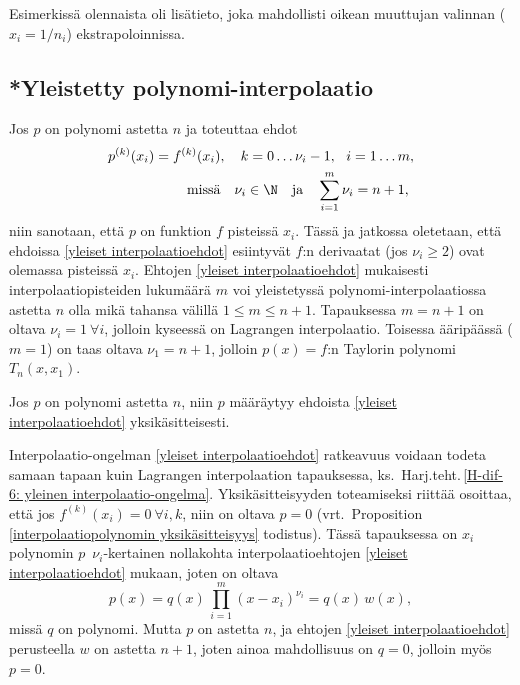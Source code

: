 Esimerkissä olennaista oli lisätieto, joka mahdollisti oikean muuttujan valinnan ($x_i=1/n_i$)
ekstrapoloinnissa.

\subsection{*Yleistetty polynomi-interpolaatio}

Jos $p$ on polynomi astetta $n$ ja toteuttaa ehdot
\begin{equation} \label{yleiset interpolaatioehdot} 
\begin{aligned}
p^{(k)}(x_i)&= f^{(k)}(x_i),\quad k=0\ldots\nu_i-1,\ \ i=1\ldots m, \\ 
           &\qquad\ \text{missä}\quad \nu_i \in \N \quad \text{ja} \quad \sum_{i=1}^m \nu_i=n+1,
\end{aligned} \end{equation}
niin sanotaan, että $p$ on funktion $f$  pisteissä
$x_i$. Tässä ja jatkossa oletetaan, että ehdoissa \eqref{yleiset interpolaatioehdot}
esiintyvät $f$:n derivaatat (jos $\nu_i \ge 2$) ovat olemassa pisteissä $x_i$. Ehtojen
\eqref{yleiset interpolaatioehdot} mukaisesti interpolaatiopisteiden lukumäärä $m$ voi
yleistetyssä polynomi-interpolaatiossa astetta $n$ olla mikä tahansa välillä $1 \le m \le n+1$.
Tapauksessa $m=n+1$ on oltava $\nu_i=1\ \forall i$, jolloin kyseessä on Lagrangen
interpolaatio. Toisessa ääripäässä ($m=1$) on taas oltava $\nu_1=n+1$, jolloin $p(x)=f$:n
Taylorin polynomi $T_n(x,x_1)$.
\begin{Prop} Jos $p$ on polynomi astetta $n$, niin $p$ määräytyy ehdoista 
\eqref{yleiset interpolaatioehdot} yksikäsitteisesti. 
\end{Prop}
\tod Interpolaatio-ongelman \eqref{yleiset interpolaatioehdot} ratkeavuus voidaan todeta
samaan tapaan kuin Lagrangen interpolaation tapauksessa, ks.\
Harj.teht.\,\ref{H-dif-6: yleinen interpolaatio-ongelma}. Yksikäsitteisyyden toteamiseksi
riittää osoittaa, että jos $f^{(k)}(x_i)=0\ \forall i,k$, niin on oltava $p=0$
(vrt.\ Proposition \ref{interpolaatiopolynomin yksikäsitteisyys} todistus). Tässä tapauksessa
on $x_i$  polynomin $p$ $\,\nu_i$-kertainen nollakohta interpolaatioehtojen
\eqref{yleiset interpolaatioehdot} mukaan, joten on oltava
\[ 
p(x) = q(x)\,\prod_{i=1}^m (x-x_i)^{\nu_i} = q(x)\,w(x), 
\]
missä $q$ on polynomi. Mutta $p$ on astetta $n$, ja ehtojen \eqref{yleiset interpolaatioehdot}
perusteella $w$ on astetta $n+1$, joten ainoa mahdollisuus on $q=0$, jolloin myös $p=0$.
\loppu

